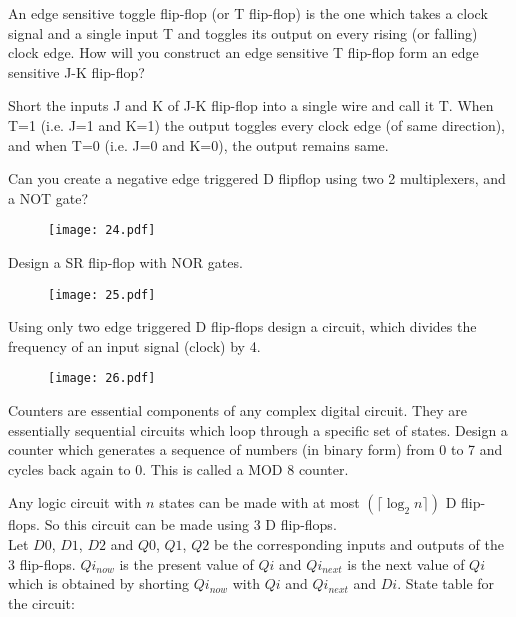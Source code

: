 \begin{ExerciseList}
\Exercise
An edge sensitive toggle flip-flop (or T flip-flop) is the one which takes a
clock signal and a single input T and toggles its output on every rising (or
falling) clock edge. How will you construct an edge sensitive T flip-flop form
an edge sensitive J-K flip-flop?

\Answer
Short the inputs J and K of J-K flip-flop into a single wire and call it T.
When T=1 (i.e. J=1 and K=1) the output toggles every clock edge (of same
direction), and when T=0 (i.e. J=0 and K=0), the output remains same.

\Exercise[difficulty=1]
Can you create a negative edge triggered D flipflop using two 2 multiplexers, and a NOT gate?
\begin{figure}[H]
  \centering
  \texttt{[image: 24.pdf]}
  \caption{}
\end{figure}
\Exercise
Design a SR flip-flop with NOR gates.
\begin{figure}[H]
  \centering
  \texttt{[image: 25.pdf]}
\end{figure}
\Exercise
Using only two edge triggered D flip-flops design a circuit, which divides
the frequency of an input signal (clock) by 4. 
\begin{figure}[H]
  \centering
  \texttt{[image: 26.pdf]}
  \caption{}
\end{figure}

\Exercise[difficulty=2]
Counters are essential components of any complex digital circuit. They are
essentially sequential circuits which loop through a specific set of states.
Design
a counter which generates 
a sequence of numbers (in binary form) from 0 to 7 and cycles back again to 0.
This is called a MOD 8 counter. 

\Answer
Any logic circuit with $n$ states can be made with at most $(\lceil \log_2 n \rceil)$ D flip-flops. So this circuit can be made using 
3 D flip-flops.\\

Let $D0$, $D1$, $D2$ and $Q0$, $Q1$, $Q2$ be the corresponding inputs and outputs of the 3 flip-flops.
$Qi_{now}$ is the present value of $Qi$ and $Qi_{next}$ is the next value of $Qi$ which is obtained by shorting $Qi_{now}$ with $Qi$ and  $Qi_{next}$ and $Di$. 
State table for the circuit:\\


\end{ExerciseList}
